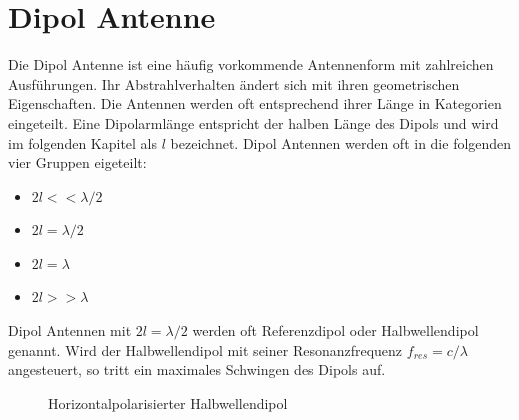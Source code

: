 \section{Dipol Antenne}
Die Dipol Antenne ist eine häufig vorkommende Antennenform  mit zahlreichen Ausführungen. Ihr Abstrahlverhalten ändert sich mit ihren geometrischen Eigenschaften. Die Antennen werden oft entsprechend ihrer Länge in Kategorien eingeteilt. Eine Dipolarmlänge entspricht der halben Länge des Dipols und wird im folgenden Kapitel als $l$ bezeichnet. Dipol Antennen werden oft in die folgenden vier Gruppen eigeteilt:
\begin{itemize}
\item $2l<< \lambda/2 $
\item $2l = \lambda/2 $
\item $2l = \lambda $
\item $2l>> \lambda $
\end{itemize} 
Dipol Antennen mit $2l=\lambda/2$ werden oft Referenzdipol oder Halbwellendipol genannt. Wird der Halbwellendipol mit seiner Resonanzfrequenz $f_{res}=c/\lambda$ angesteuert, so tritt ein maximales Schwingen des Dipols auf. 

\begin{figure}[!ht]%
	\begin{center}
	\end{center}
\caption{Horizontalpolarisierter Halbwellendipol}
\label{fig:HalbWellenDipolHorizontal}
\end{figure}

